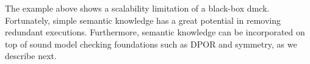 The example above shows a scalability limitation of a black-box dmck.
Fortunately, simple semantic knowledge has a great potential in removing
redundant executions.  Furthermore, semantic knowledge can be incorporated on
top of sound model checking foundations such as DPOR and symmetry, as we
describe next.
